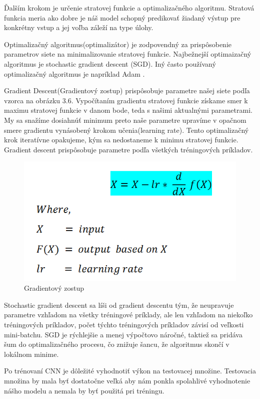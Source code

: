 Ďalším krokom je určenie stratovej funkcie a optimalizačného algoritmu. Stratová funkcia meria ako dobre je náš model schopný predikovať žiadaný výstup pre konkrétny vstup a jej voľba záleží na type úlohy. 

Optimalizačný algoritmus(optimalizátor) je zodpovendný za prispôsobenie parametrov siete na minimalizovanie stratovej funkcie. Najbežnejší optimaizačný algoritmus je stochastic gradient descent (SGD). Iný často používaný optimalizačný algoritmus je napríklad Adam \cite{Adam}. 

Gradient Descent(Gradientový zostup) prispôsobuje parametre našej siete podľa vzorca na obrázku 3.6. Vypočítaním gradientu stratovej funkcie získame smer k maximu stratovej funkcie v danom bode, teda s našimi aktualnými parametrami. My sa snažíme dosiahnúť minimum preto naše parametre upravíme v opačnom smere gradientu vynásobený krokom učenia(learning rate). Tento optimalizačný krok iteratívne opakujeme, kým sa nedostaneme k minimu stratovej funkcie. Gradient descent prispôsobuje parametre podľa všetkých tréningových príkladov.

\begin{figure}[!hbt]
\includegraphics[width=\textwidth]{images/GD.png}
\centering
\caption{Gradientový zostup}
\label{fig:image}
\end{figure}

Stochastic gradient descent sa líši od gradient descentu tým, že neupravuje parametre vzhľadom na všetky tréningové príklady, ale len vzhľadom na niekoľko tréningových príkladov, počet týchto tréningových príkladov závisí od veľkosti mini-batchu. SGD je rýchlejšie a menej výpočtovo náročné, taktiež sa pridáva šum do optimalizačného procesu, čo znižuje šancu, že algoritmus skončí v lokálnom minime. 

Po trénovaní CNN je dôležité vyhodnotiť výkon na testovacej množine. Testovacia množina by mala byť dostatočne veľká aby nám ponkla spolahlivé vyhodnotenie nášho modelu a nemala by byť použitá pri tréningu. 

